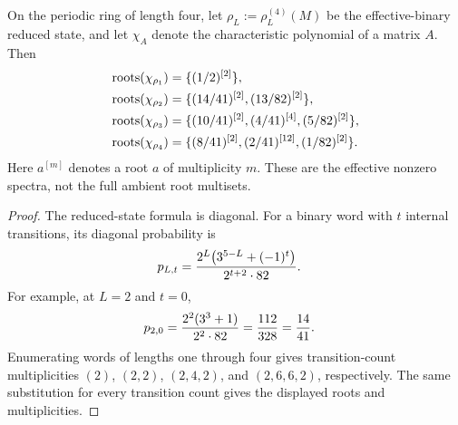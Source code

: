 \begin{lemma}
    \label{thm:cpsv_example411_length_four_effective_spectra}
    \leanok
    On the periodic ring of length four, let
    $\rho_L:=\rho_L^{(4)}(M)$ be the effective-binary reduced state, and let
    $\chi_A$ denote the characteristic polynomial of a matrix $A$.  Then
    \begin{align}
        \operatorname{roots}(\chi_{\rho_1})
         & =\{(1/2)^{[2]}\},                             \\
        \operatorname{roots}(\chi_{\rho_2})
         & =\{(14/41)^{[2]},(13/82)^{[2]}\},             \\
        \operatorname{roots}(\chi_{\rho_3})
         & =\{(10/41)^{[2]},(4/41)^{[4]},(5/82)^{[2]}\}, \\
        \operatorname{roots}(\chi_{\rho_4})
         & =\{(8/41)^{[2]},(2/41)^{[12]},(1/82)^{[2]}\}.
        \notag
    \end{align}
    Here $a^{[m]}$ denotes a root $a$ of multiplicity $m$.  These are the
    effective nonzero spectra, not the full ambient root multisets.
\end{lemma}

\begin{proof}
    \leanok
    The reduced-state formula is diagonal.  For a binary word with $t$ internal
    transitions, its diagonal probability is
    \begin{align}
        p_{L,t}
         & =\frac{2^L\bigl(3^{5-L}+(-1)^t\bigr)}{2^{t+2}\cdot82}.
        \notag
    \end{align}
    For example, at $L=2$ and $t=0$,
    \begin{align}
        p_{2,0}
         & =\frac{2^2(3^3+1)}{2^2\cdot82}
        =\frac{112}{328}=\frac{14}{41}.
        \notag
    \end{align}
    Enumerating words of lengths one through four gives transition-count
    multiplicities $(2)$, $(2,2)$, $(2,4,2)$, and $(2,6,6,2)$, respectively.
    The same substitution for every transition count gives the displayed roots
    and multiplicities.
\end{proof}

